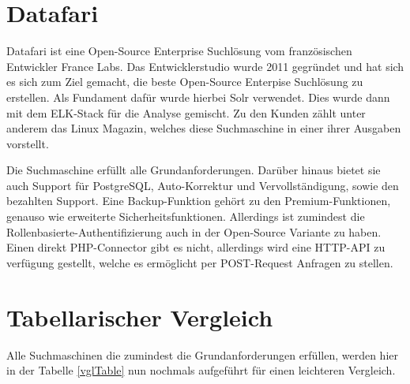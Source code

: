 \section{Datafari}
\label{datafari}

Datafari ist eine Open-Source Enterprise Suchlösung vom französischen Entwickler France Labs. Das Entwicklerstudio wurde 2011 gegründet und hat sich es sich zum Ziel gemacht, die beste Open-Source Enterpise Suchlösung zu erstellen. \cite{Labs.2019} Als Fundament dafür wurde hierbei Solr verwendet. Dies wurde dann mit dem ELK-Stack für die Analyse gemischt. Zu den Kunden zählt unter anderem das Linux Magazin, welches diese Suchmaschine in einer ihrer Ausgaben vorstellt. \cite{MichaelBrandenburg.2019}

Die Suchmaschine erfüllt alle Grundanforderungen. Darüber hinaus bietet sie auch Support für PostgreSQL, Auto-Korrektur und Vervollständigung, sowie den bezahlten Support. Eine Backup-Funktion gehört zu den Premium-Funktionen, genauso wie erweiterte Sicherheitsfunktionen. Allerdings ist zumindest die Rollenbasierte-Authentifizierung auch in der Open-Source Variante zu haben. Einen direkt PHP-Connector gibt es nicht, allerdings wird eine HTTP-API zu verfügung gestellt, welche es ermöglicht per POST-Request Anfragen zu stellen. \cite{Labs.b}

\section {Tabellarischer Vergleich}

Alle Suchmaschinen die zumindest die Grundanforderungen erfüllen, werden hier in der Tabelle \ref{vglTable} nun nochmals aufgeführt für einen leichteren Vergleich.

